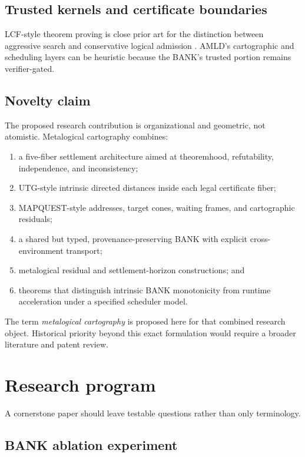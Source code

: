 \documentclass[11pt]{article}
\begin{document}
\subsection{Trusted kernels and certificate boundaries}

LCF-style theorem proving is close prior art for the distinction between aggressive search and conservative logical admission \cite{GordonLCF}. AMLD's cartographic and scheduling layers can be heuristic because the BANK's trusted portion remains verifier-gated.

\subsection{Novelty claim}

The proposed research contribution is organizational and geometric, not atomistic. Metalogical cartography combines:
\begin{enumerate}[label=(\roman*)]
\item a five-fiber settlement architecture aimed at theoremhood, refutability, independence, and inconsistency;
\item UTG-style intrinsic directed distances inside each legal certificate fiber;
\item MAPQUEST-style addresses, target cones, waiting frames, and cartographic residuals;
\item a shared but typed, provenance-preserving BANK with explicit cross-environment transport;
\item metalogical residual and settlement-horizon constructions; and
\item theorems that distinguish intrinsic BANK monotonicity from runtime acceleration under a specified scheduler model.
\end{enumerate}
The term \emph{metalogical cartography} is proposed here for that combined research object. Historical priority beyond this exact formulation would require a broader literature and patent review.

\section{Research program}

A cornerstone paper should leave testable questions rather than only terminology.

\subsection{BANK ablation experiment}
\end{document}
